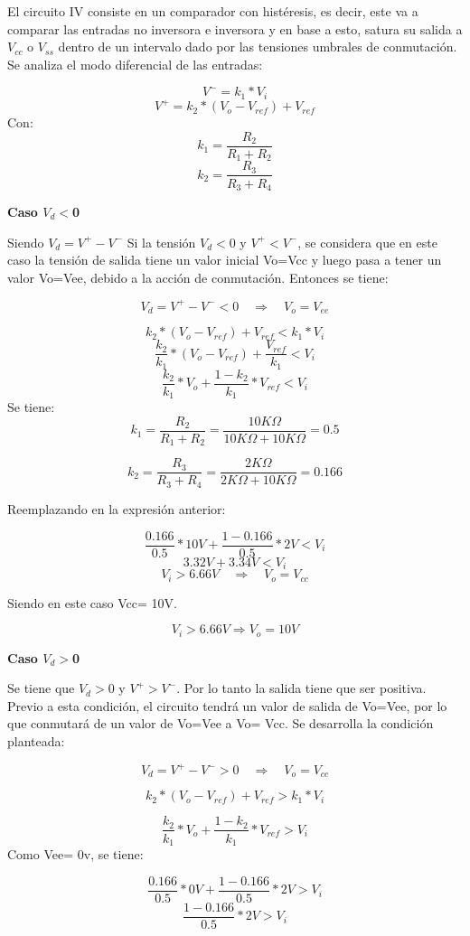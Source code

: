 El circuito IV consiste en un comparador con histéresis, es decir, este va a comparar las entradas no inversora e inversora y en base a esto, satura su salida a $V_{cc} $ o $ V_{ss} $ dentro de un
intervalo dado por las tensiones umbrales de conmutación. Se analiza el modo diferencial de las entradas:

\[V^- = k_1 * V_i\]
\[V^+ = k_2 * (V_o - V_{ref}) + V_{ref}\]
Con:
\[k_1 = \frac{R_2}{R_1 + R_2}\]
\[ k_2 = \frac{R_3}{R_3 + R_4}\]

\vspace{1em}

\textbf{Caso $V_d<$0}

Siendo $V_d = V^+ - V^-$ Si la tensión $V_d < 0$ y $V^+ < V^-$,  se considera que en este caso la tensión de salida tiene un valor inicial Vo=Vcc y luego pasa a tener un valor Vo=Vee, debido a la acción de conmutación.  Entonces se tiene:

\[V_d = V^+ - V^- < 0 \quad \Rightarrow \quad V_o = V_{ee}\]

\[k_2 * (V_o - V_{ref}) + V_{ref} < k_1 * V_i\]
\[\frac{k_2}{k_1} * (V_o - V_{ref}) + \frac{V_{ref}}{k_1} < V_i \]
\[\frac{k_2}{k_1} * V_o + \frac{1 - k_2}{k_1} * V_{ref} < V_i \]
Se tiene:
\[ k_1 = \frac{R_2}{R_1 + R_2} = \frac{10K\Omega}{10K\Omega + 10K\Omega} = 0.5\]

\[ k_2 = \frac{R_3}{R_3 + R_4} = \frac{2K\Omega}{2K\Omega + 10K\Omega} = 0.166\]

Reemplazando en la expresión anterior:

\[\frac{0.166}{0.5} * 10V + \frac{1 - 0.166}{0.5} * 2V < V_i \]
\[3.32V + 3.34V < V_i \]
\[V_i > 6.66V \quad \Rightarrow \quad V_o = V_{cc}\]

Siendo en este caso Vcc= 10V.

\[V_i > 6.66V \Rightarrow V_o = 10V\]

\textbf{Caso  $V_d >$0}

Se tiene que $V_d > 0$ y $V^+ > V^- $. Por lo tanto la salida tiene que ser positiva. 
Previo a esta condición, el circuito tendrá un valor de salida de Vo=Vee, por lo que conmutará de un valor de Vo=Vee a Vo= Vcc. Se desarrolla la condición planteada:

\[V_d = V^+ - V^- > 0 \quad \Rightarrow \quad V_o = V_{cc}\]

\[ k_2 * (V_o - V_{ref}) + V_{ref} > k_1 * V_i\]

\[\frac{k_2}{k_1} * V_o + \frac{1 - k_2}{k_1} * V_{ref} > V_i \]
Como Vee= 0v, se tiene:

\[\frac{0.166}{0.5} * 0V + \frac{1 - 0.166}{0.5} * 2V > V_i \]
\[\frac{1 - 0.166}{0.5} * 2V > V_i \]

